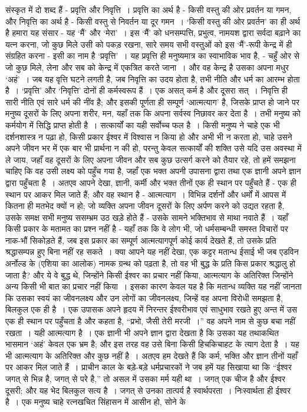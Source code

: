संस्कृत में दो शब्द हैं - प्रवृत्ति और निवृत्ति~। प्रवृत्ति का अर्थ है - किसी वस्तु की ओर प्रवर्तन या गमन, और निवृत्ति का अर्थ है - किसी वस्तु से निवर्तन या दूर गमन~। ‘किसी वस्तु की ओर प्रवर्तन’ का ही अर्थ है हमारा यह संसार - यह ‘मैं’ और ‘मेरा’~। इस ‘मैं’ को धनसम्पत्ति, प्रभुत्व, नामयश द्वारा सर्वदा बढ़ाने का यत्न करना, जो कुछ मिले उसी को पकड़ रखना, सारे समय सभी वस्तुओं को इस ‘मैं’-रूपी केन्द्र में ही संग्रहित करना - इसी का नाम है ‘प्रवृत्ति’~। यह प्रवृत्ति ही मनुष्यमात्र का स्वाभाविक भाव है, - चहुँ ओर से जो कुछ मिले, लेना और सब को केन्द्र में एकत्रित करते जाना~। और वह केन्द्र है उसका अपना मधुर ‘अहं’~। जब यह वृत्ति घटने लगती है, जब निवृत्ति का उदय होता है, तभी नीति और धर्म का आरम्भ होता है~। ‘प्रवृत्ति’ और ‘निवृत्ति’ दोनों ही कर्मस्वरूप हैं~। एक असत् कर्म है और दूसरा सत्~। निवृत्ति ही सारी नीति एवं सारे धर्म की नींव है; और इसकी पूर्णता ही सम्पूर्ण ‘आत्मत्याग’ है, जिसके प्राप्त हो जाने पर मनुष्य दूसरों के लिए अपना शरीर, मन, यहाँ तक कि अपना सर्वस्व निछावर कर देता है~। तभी मनुष्य को कर्मयोग में सिद्धि प्राप्त होती है~। सत्कार्यों का यही सर्वोच्च फल है~। किसी मनुष्य ने चाहे एक भी दर्शनशास्त्र न पढ़ा हो, किसी प्रकार ईश्वर में विश्वास न किया हो और अभी भी न करता हो, चाहे उसने अपने जीवन भर में एक बार भी प्रार्थना न की हो, परन्तु केवल सत्कार्यों की शक्ति उसे यदि उस अवस्था में ले जाय, जहाँ वह दूसरों के लिए अपना जीवन और सब कुछ उत्सर्ग करने को तैयार रहे, तो हमें समझना चाहिए कि वह उसी लक्ष्य को पहुँच गया है, जहाँ एक भक्त अपनी उपासना द्वारा तथा एक ज्ञानी अपने ज्ञान द्वारा पहुँचता है~। अतएव आपने देखा, ज्ञानी, कर्मी और भक्त तीनों एक ही स्थान पर पहुँचते हैं - एक ही स्थान पर आकर मिल जाते हैं; और वह स्थान है - आत्मत्याग~। विभिन्न दर्शनों और धर्मों में आपस में कितना ही मतभेद क्यों न हो; जो व्यक्ति अपना जीवन दूसरों के लिए अर्पण करने को उद्यत रहता है, उसके समक्ष सभी मनुष्य ससम्भ्रम उठ खड़े होते हैं - उसके सामने भक्तिभाव से माथा नवाते हैं~। यहाँ किसी प्रकार के मतामत का प्रश्न नहीं है - यहाँ तक कि वे लोग भी, जो धर्मसम्बन्धी समस्त विचारों पर नाक-भौं सिकोड़ते हैं, जब इस प्रकार का सम्पूर्ण आत्मत्यागपूर्ण कोई कार्य देखते हैं, तो उसके प्रति श्रद्धासम्पन्न हुए बिना नहीं रह सकते~। क्या आपने यह नहीं देखा, एक कट्टर मतान्ध ईसाई भी जब एडविन अर्नोल्ड के  (एशिया का आलोक) नामक ग्रन्थ को पढ़ता है, तो वह भी बुद्ध के प्रति किस प्रकार श्रद्धालु हो जाता है? और ये वे बुद्ध थे, जिन्होंने किसी ईश्वर का प्रचार नहीं किया, आत्मत्याग के अतिरिक्त जिन्होंने अन्य किसी भी बात का प्रचार नहीं किया~। इसका कारण केवल यह है कि मतान्ध व्यक्ति यह नहीं जानता कि उसका स्वयं का जीवनलक्ष्य और उन लोगों का जीवनलक्ष्य, जिन्हें वह अपना विरोधी समझता है, बिलकुल एक ही है~। एक उपासक अपने हृदय में निरन्तर ईश्वरीभाव एवं साधुभाव रखते हुए अन्त में उस एक ही स्थान पर पहुँचता है और कहता है, “प्रभो, जैसी तेरी मरजी~।” वह अपने नाम से कुछ बचा नहीं रखता~। यही आत्मत्याग है~। एक ज्ञानी भी अपने ज्ञान द्वारा देखता है कि उसका यह तथाकथित भासमान ‘अहं’ केवल एक भ्रम है; और इस तरह वह उसे बिना किसी हिचकिचाहट के त्याग देता है~। यह भी आत्मत्याग के अतिरिक्त और कुछ नहीं है~। अतएव हम देखते हैं कि कर्म, भक्ति और ज्ञान तीनों यहाँ पर आकर मिल जाते हैं~। प्राचीन काल के बड़े-बड़े धर्मप्रचारकों ने जब हमें यह सिखाया था कि “ईश्वर जगत् से भिन्न है, जगत् से परे है,” तो असल में उसका मर्म यही था~। जगत् एक चीज है और ईश्वर दूसरी; और यह भेद बिलकुल सत्य है~। जगत् से उनका तात्पर्य है स्वार्थपरता~। निःस्वार्थता ही ईश्वर है~। एक मनुष्य चाहे रत्नखचित सिंहासन में आसीन हो, सोने के 